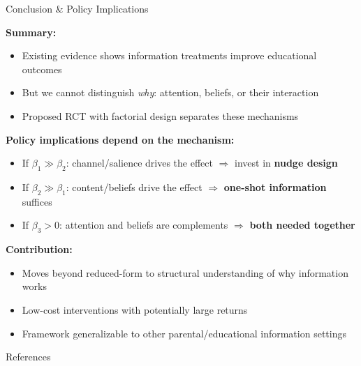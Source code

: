 \documentclass[aspectratio=169,11pt]{beamer}
\begin{document}
\begin{frame}{Conclusion \& Policy Implications}

\textbf{Summary:}
\begin{itemize}
    \item Existing evidence shows information treatments improve educational outcomes
    \item But we cannot distinguish \emph{why}: attention, beliefs, or their interaction
    \item Proposed RCT with factorial design separates these mechanisms
\end{itemize}

\bigskip

\textbf{Policy implications depend on the mechanism:}
\begin{itemize}
    \item If $\beta_1 \gg \beta_2$: channel/salience drives the effect $\Rightarrow$ invest in \textbf{nudge design}
    \item If $\beta_2 \gg \beta_1$: content/beliefs drive the effect $\Rightarrow$ \textbf{one-shot information} suffices
    \item If $\beta_3 > 0$: attention and beliefs are complements $\Rightarrow$ \textbf{both needed together}
\end{itemize}

\bigskip

\textbf{Contribution:}
\begin{itemize}
    \item Moves beyond reduced-form to structural understanding of why information works
    \item Low-cost interventions with potentially large returns
    \item Framework generalizable to other parental/educational information settings
\end{itemize}

\end{frame}


\begin{frame}[allowframebreaks]{References}
\small


\end{frame}
\end{document}
